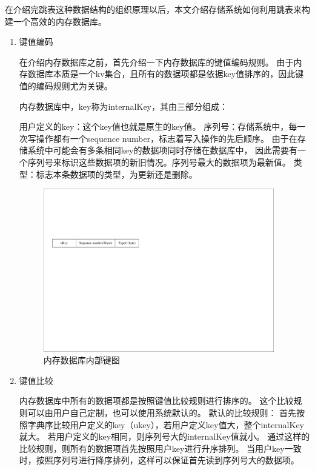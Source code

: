 		在介绍完跳表这种数据结构的组织原理以后，本文介绍存储系统如何利用跳表来构建一个高效的内存数据库。

		\begin{enumerate}
			\item 键值编码
			
			在介绍内存数据库之前，首先介绍一下内存数据库的键值编码规则。
			由于内存数据库本质是一个kv集合，且所有的数据项都是依据key值排序的，因此键值的编码规则尤为关键。

			内存数据库中，key称为internalKey，其由三部分组成：

			用户定义的key：这个key值也就是原生的key值。
			序列号：存储系统中，每一次写操作都有一个sequence number，标志着写入操作的先后顺序。
			由于在存储系统中可能会有多条相同key的数据项同时存储在数据库中，
			因此需要有一个序列号来标识这些数据项的新旧情况。序列号最大的数据项为最新值。
			类型：标志本条数据项的类型，为更新还是删除。

			\begin{figure}[H]
				\centering
				\includegraphics[width=0.95\textwidth]{pdf/internalkey}
				\caption{内存数据库内部键图}
				\label{internalkey}
			\end{figure}

			\item 键值比较
			
			内存数据库中所有的数据项都是按照键值比较规则进行排序的。
			这个比较规则可以由用户自己定制，也可以使用系统默认的。
			默认的比较规则：
			首先按照字典序比较用户定义的key（ukey），若用户定义key值大，整个internalKey就大。
			若用户定义的key相同，则序列号大的internalKey值就小。
			通过这样的比较规则，则所有的数据项首先按照用户key进行升序排列。
			当用户key一致时，按照序列号进行降序排列，这样可以保证首先读到序列号大的数据项。



\end{enumerate}
